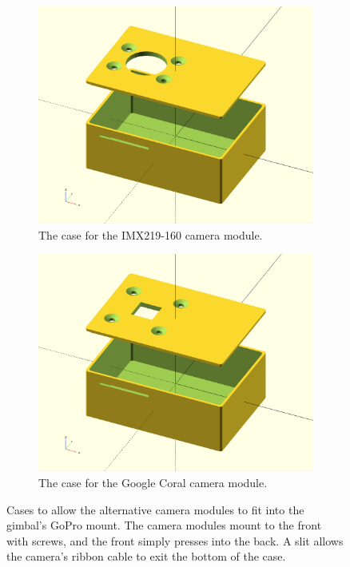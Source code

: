 \begin{figure}
    \begin{subfigure}[b]{0.48\textwidth}
        \centering
        \includegraphics[width=\textwidth]{images/nano_case.png}
        \caption{The case for the IMX219-160 camera module.}
        \label{fig:nano_case}
    \end{subfigure}
    \begin{subfigure}[b]{0.48\textwidth}
        \centering
        \includegraphics[width=\textwidth]{images/coral_case.png}
        \caption{The case for the Google Coral camera module.}
        \label{fig:coral_case}
    \end{subfigure}
    \caption{Cases to allow the alternative camera modules to fit into the gimbal's GoPro mount. The camera modules mount to the front with screws, and the front simply presses into the back. A slit allows the camera's ribbon cable to exit the bottom of the case.}
\end{figure}



